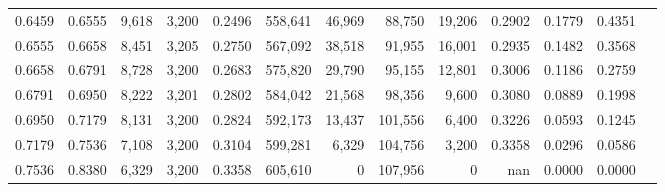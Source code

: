 \begin{tabular}{rrrrrrrrrrrrr}
0.6459 & 0.6555 &  9,618 & 3,200 &                                     0.2496 & 558,641 &  46,969 &  88,750 &  19,206 & 0.2902 & 0.1779 & 0.4351 \\
0.6555 & 0.6658 &  8,451 & 3,205 &                                     0.2750 & 567,092 &  38,518 &  91,955 &  16,001 & 0.2935 & 0.1482 & 0.3568 \\
0.6658 & 0.6791 &  8,728 & 3,200 &                                     0.2683 & 575,820 &  29,790 &  95,155 &  12,801 & 0.3006 & 0.1186 & 0.2759 \\
0.6791 & 0.6950 &  8,222 & 3,201 &                                     0.2802 & 584,042 &  21,568 &  98,356 &   9,600 & 0.3080 & 0.0889 & 0.1998 \\
0.6950 & 0.7179 &  8,131 & 3,200 &                                     0.2824 & 592,173 &  13,437 & 101,556 &   6,400 & 0.3226 & 0.0593 & 0.1245 \\
0.7179 & 0.7536 &  7,108 & 3,200 &                                     0.3104 & 599,281 &   6,329 & 104,756 &   3,200 & 0.3358 & 0.0296 & 0.0586 \\
0.7536 & 0.8380 &  6,329 & 3,200 &                                     0.3358 & 605,610 &       0 & 107,956 &       0 &    nan & 0.0000 & 0.0000 \\
\bottomrule
\end{tabular}
